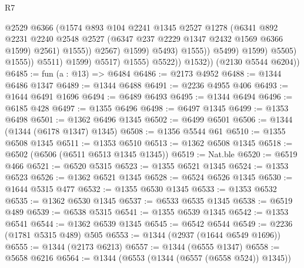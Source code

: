 \begin{lexlean}{R7}
\begin{coremodule}
                                            @2529
                                            @6366
                                            (@1574
                                              @893
                                              @104
                                              @2241
                                              @1345
                                              @2527
                                              @1278
                                              (@6341
                                                @892
                                                @2231
                                                @2240
                                                @2548
                                                @2527
                                                (@6347 @237 @2229 @1347 @2432 @1569 @6366 @1599)
                                                @2561)
                                              @1555))
                                          @2567)
                                        @1599)
                                      @5493)
                                    @1555))
                                @5499)
                              @1599)
                            @5505)
                          @1555))
                      @5511)
                    @1599)
                  @5517)
                @1555)
              @5522))
          @1532))
      (@2130 @5544 @6204))
@6485 := fun (a : @13) => @6484
@6486 := @2173 @4952
@6488 := @1344 @6486 @1347
@6489 := @1344 @6488
@6491 := @2236 @4955 @406
@6493 := @1644 @6491 @1696
@6494 := @6489 @6493
@6495 := @1344 @6494
@6496 := @6185 @428
@6497 := @1355 @6496
@6498 := @6497 @1345
@6499 := @1353 @6498
@6501 := @1362 @6496 @1345
@6502 := @6499 @6501
@6506 := @1344 (@1344 (@6178 @1347) @1345)
@6508 := @1356 @5544 @61
@6510 := @1355 @6508 @1345
@6511 := @1353 @6510
@6513 := @1362 @6508 @1345
@6518 := @6502 (@6506 (@6511 @6513 @1345 @1345))
@6519 := Nat.ble
@6520 := @6519 @466
@6521 := @6520 @5315
@6523 := @1355 @6521 @1345
@6524 := @1353 @6523
@6526 := @1362 @6521 @1345
@6528 := @6524 @6526 @1345
@6530 := @1644 @5315 @477
@6532 := @1355 @6530 @1345
@6533 := @1353 @6532
@6535 := @1362 @6530 @1345
@6537 := @6533 @6535 @1345
@6538 := @6519 @489
@6539 := @6538 @5315
@6541 := @1355 @6539 @1345
@6542 := @1353 @6541
@6544 := @1362 @6539 @1345
@6545 := @6542 @6544
@6549 := @2236 (@1781 @5315 @489) @505
@6553 := @1344 (@2937 (@1644 @6549 @1696))
@6555 := @1344 (@2173 @6213)
@6557 := @1344 (@6555 @1347)
@6558 := @5658 @6216
@6564 := @1344 (@6553 (@1344 (@6557 (@6558 @524)) @1345))

\end{coremodule}
\end{lexlean}
